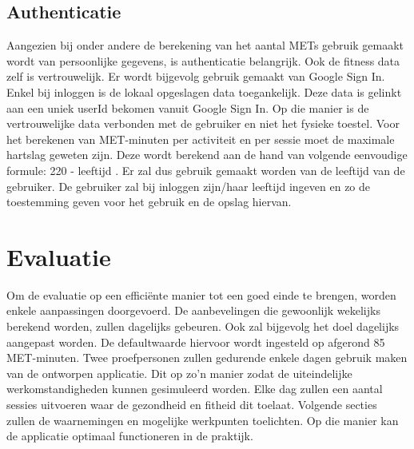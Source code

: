 \subsection{Authenticatie}
Aangezien bij onder andere de berekening van het aantal METs gebruik gemaakt wordt van persoonlijke gegevens, is authenticatie belangrijk. Ook de fitness data zelf is vertrouwelijk. Er wordt bijgevolg gebruik gemaakt van Google Sign In. Enkel bij inloggen is de lokaal opgeslagen data toegankelijk. Deze data is gelinkt aan een uniek userId bekomen vanuit Google Sign In. Op die manier is de vertrouwelijke data verbonden met de gebruiker en niet het fysieke toestel.
Voor het berekenen van MET-minuten per activiteit en per sessie moet de maximale hartslag geweten zijn. Deze wordt berekend aan de hand van volgende eenvoudige formule: 220 - leeftijd \cite{ref71} \cite{ref73}. Er zal dus gebruik gemaakt worden van de leeftijd van de gebruiker. De gebruiker zal bij inloggen zijn/haar leeftijd ingeven en zo de toestemming geven voor het gebruik en de opslag hiervan. 

\section{Evaluatie}
Om de evaluatie op een efficiënte manier tot een goed einde te brengen, worden enkele aanpassingen doorgevoerd. De aanbevelingen die gewoonlijk wekelijks berekend worden, zullen dagelijks gebeuren. Ook zal bijgevolg het doel dagelijks aangepast worden. De defaultwaarde hiervoor wordt ingesteld op afgerond 85 MET-minuten. Twee proefpersonen zullen gedurende enkele dagen gebruik maken van de ontworpen applicatie. Dit op zo'n manier zodat de uiteindelijke werkomstandigheden kunnen gesimuleerd worden. Elke dag zullen een aantal sessies uitvoeren waar de gezondheid en fitheid dit toelaat. Volgende secties zullen de waarnemingen en mogelijke werkpunten toelichten. Op die manier kan de applicatie optimaal functioneren in de praktijk.

